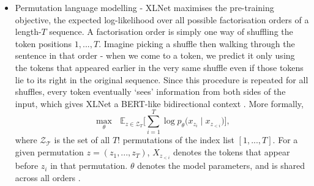 \documentclass[10pt,oneside]{report}
\begin{document}
\begin{itemize}
    \item{Permutation language modelling - XLNet maximises the pre-training objective, the expected log-likelihood over all possible factorisation orders of a length-$T$ sequence. A factorisation order is simply one way of shuffling the token positions $1, ..., T$. Imagine picking a shuffle then walking through the sentence in that order - when we come to a token, we predict it only using the tokens that appeared earlier in the very same shuffle even if those tokens lie to its right in the original sequence. Since this procedure is repeated for all shuffles, every token eventually `sees' information from both sides of the input, which gives XLNet a BERT-like bidirectional context \cite{yang2019xlnet}. More formally, 
            \begin{equation} \max_{\theta} \text{  } \mathbb{E}_{z\in\mathcal{Z}_T} \bigl[ \sum_{i=1}^{T} \log p_{\theta} \bigl(x_{z_i}\mid x_{z_{<i}}\bigr) \bigr], \label{eq:plm} \end{equation}
            where $\mathcal{Z_T}$ is the set of all $T!$ permutations of the index list $[1, ... , T]$. For a given permutation $z = (z_1, ..., z_T)$, $X_{z_{<i}}$ denotes the tokens that appear before $z_i$ in that permutation. $\theta$ denotes the model parameters, and is shared across all orders \cite{yang2019xlnet}.
        }


\end{itemize}
\end{document}
